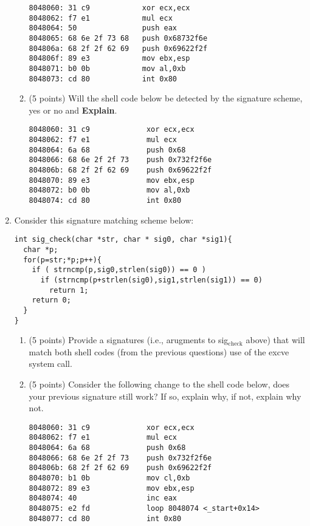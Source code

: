 \documentclass{article}[9pt]
\begin{document}
\begin{enumerate}
\begin{enumerate}
\begin{verbatim}
8048060: 31 c9            xor ecx,ecx
8048062: f7 e1            mul ecx
8048064: 50               push eax
8048065: 68 6e 2f 73 68   push 0x68732f6e
804806a: 68 2f 2f 62 69   push 0x69622f2f
804806f: 89 e3            mov ebx,esp
8048071: b0 0b            mov al,0xb
8048073: cd 80            int 0x80
\end{verbatim}

\item (5 points) Will the shell code below be detected by the signature scheme, yes or no and \textbf{Explain}.

\begin{verbatim}
8048060: 31 c9             xor ecx,ecx
8048062: f7 e1             mul ecx
8048064: 6a 68             push 0x68
8048066: 68 6e 2f 2f 73    push 0x732f2f6e
804806b: 68 2f 2f 62 69    push 0x69622f2f
8048070: 89 e3             mov ebx,esp
8048072: b0 0b             mov al,0xb
8048074: cd 80             int 0x80
\end{verbatim}
\end{enumerate}

\item Consider this signature matching scheme below:

\begin{verbatim}
int sig_check(char *str, char * sig0, char *sig1){
  char *p;
  for(p=str;*p;p++){
    if ( strncmp(p,sig0,strlen(sig0)) == 0 )
      if (strncmp(p+strlen(sig0),sig1,strlen(sig1)) == 0)
        return 1;
    return 0;
  }
}
\end{verbatim}

\begin{enumerate}
\item (5 points) Provide a signatures (i.e., arugments to sig\(_{\text{check}}\) above) that
will match both shell codes (from the previous questions) use
of the excve system call.

\item (5 points) Consider the following change to the shell code below, does
your previous signature still work? If so, explain why, if not,
explain why not.

\begin{verbatim}
8048060: 31 c9             xor ecx,ecx
8048062: f7 e1             mul ecx
8048064: 6a 68             push 0x68
8048066: 68 6e 2f 2f 73    push 0x732f2f6e
804806b: 68 2f 2f 62 69    push 0x69622f2f
8048070: b1 0b             mov cl,0xb
8048072: 89 e3             mov ebx,esp
8048074: 40                inc eax
8048075: e2 fd             loop 8048074 <_start+0x14>
8048077: cd 80             int 0x80
\end{verbatim}
\end{enumerate}


\end{enumerate}
\end{document}
